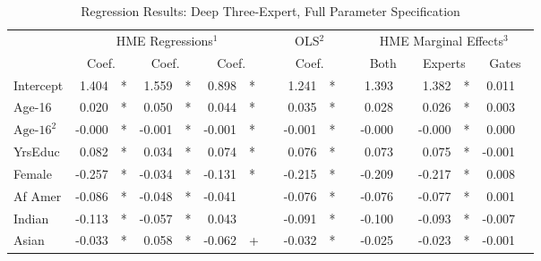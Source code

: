 \documentclass[12pt]{article}
\begin{document}
\begin{landscape}
  \begin{table} \centering
    \caption{Regression Results: Deep Three-Expert, Full Parameter Specification}
      \begin{threeparttable}
        \begin{tabular}[l]{l r l r l r l c r l c r l r l r l}
  
  \cmidrule{1-17}
  & \multicolumn{6}{c}{HME Regressions$^{1}$} &&  \multicolumn{2}{c}{OLS$^{2}$} && \multicolumn{6}{c}{HME Marginal Effects$^{3}$} \\
  \cmidrule(l){2-7}    \cmidrule(l){9-10}     \cmidrule(l){12-17}
  & \multicolumn{2}{c}{Coef.} &  \multicolumn{2}{c}{Coef.} &  \multicolumn{2}{c}{Coef.}  && \multicolumn{2}{c}{Coef.} && \multicolumn{2}{c}{Both}    &  \multicolumn{2}{c}{Experts}  &  \multicolumn{2}{c}{Gates} \\
                  \cmidrule(l){2-3} \cmidrule(l){4-5} \cmidrule(l){6-7} \cmidrule(l){9-10} \cmidrule(l){12-13} \cmidrule(l){14-15} \cmidrule(l){16-17}
  Intercept             &  1.404 & *      &  1.559 & *      &  0.898 & *      &&  1.241 & *     &&  1.393 &          &  1.382 & *        &  0.011 &        \\
  Age-16                &  0.020 & *      &  0.050 & *      &  0.044 & *      &&  0.035 & *     &&  0.028 &          &  0.026 & *        &  0.003 &        \\
  $\textrm{Age-16}^{2}$ & -0.000 & *      & -0.001 & *      & -0.001 & *      && -0.001 & *     && -0.000 &          & -0.000 & *        &  0.000 &        \\
  YrsEduc               &  0.082 & *      &  0.034 & *      &  0.074 & *      &&  0.076 & *     &&  0.073 &          &  0.075 & *        & -0.001 &        \\
  Female                & -0.257 & *      & -0.034 & *      & -0.131 & *      && -0.215 & *     && -0.209 &          & -0.217 & *        &  0.008 &        \\
  Af Amer               & -0.086 & *      & -0.048 & *      & -0.041 &        && -0.076 & *     && -0.076 &          & -0.077 & *        &  0.001 &        \\
  Indian                & -0.113 & *      & -0.057 & *      &  0.043 &        && -0.091 & *     && -0.100 &          & -0.093 & *        & -0.007 &        \\
  Asian                 & -0.033 & *      &  0.058 & *      & -0.062 & +      && -0.032 & *     && -0.025 &          & -0.023 & *        & -0.001 &        \\

\end{tabular}
\end{threeparttable}
\end{table}
\end{landscape}
\end{document}
